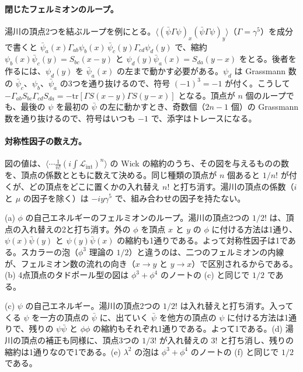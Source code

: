\documentclass[a4paper,10pt]{ltjsarticle}
\begin{document}
\paragraph{閉じたフェルミオンのループ。}湯川の頂点2つを結ぶループを例にとる。$\langle(\bar\psi\Gamma\psi)_x(\bar\psi\Gamma\psi)_y\rangle$（$\Gamma=\gamma^5$）を成分で書くと $\bar\psi_a(x)\Gamma_{ab}\psi_b(x)\,\bar\psi_c(y)\Gamma_{cd}\psi_d(y)$ で、縮約 $\psi_b(x)\bar\psi_c(y)=S_{bc}(x-y)$ と $\psi_d(y)\bar\psi_a(x)=S_{da}(y-x)$ をとる。後者を作るには、$\psi_d(y)$ を $\bar\psi_a(x)$ の左まで動かす必要がある。$\psi_d$ は Grassmann 数の $\bar\psi_c$、$\psi_b$、$\bar\psi_a$ の3つを通り抜けるので、符号 $(-1)^3=-1$ が付く。こうして $-\Gamma_{ab}S_{bc}\Gamma_{cd}S_{da}=-\mathrm{tr}[\Gamma S(x-y)\Gamma S(y-x)]$ となる。頂点が $n$ 個のループでも、最後の $\psi$ を最初の $\bar\psi$ の左に動かすとき、奇数個（$2n-1$ 個）の Grassmann 数を通り抜けるので、符号はいつも $-1$ で、添字はトレースになる。

\paragraph{対称性因子の数え方。}図の値は、$\langle\cdots\frac{1}{n!}(i\int\mathcal{L}_{\mathrm{int}})^n\rangle$ の Wick の縮約のうち、その図を与えるものの数を、頂点の係数とともに数えて決める。同じ種類の頂点が $n$ 個あると $1/n!$ が付くが、どの頂点をどこに置くかの入れ替え $n!$ と打ち消す。湯川の頂点の係数（$i$ と $\mu$ の因子を除く）は $-iy\gamma^5$ で、組み合わせの因子を持たない。

(a) $\phi$ の自己エネルギーのフェルミオンのループ。湯川の頂点2つの $1/2!$ は、頂点の入れ替えの2と打ち消す。外の $\phi$ を頂点 $x$ と $y$ の $\phi$ に付ける方法は1通り、$\psi(x)\bar\psi(y)$ と $\psi(y)\bar\psi(x)$ の縮約も1通りである。よって対称性因子は1である。スカラーの泡（$\phi^3$ 理論の $1/2$）と違うのは、二つのフェルミオンの内線が、フェルミオン数の流れの向き（$x\to y$ と $y\to x$）で区別されるからである。(b) 4点頂点のタドポール型の図は $\phi^3+\phi^4$ のノートの (c) と同じで $1/2$ である。

(c) $\psi$ の自己エネルギー。湯川の頂点2つの $1/2!$ は入れ替えと打ち消す。入ってくる $\psi$ を一方の頂点の $\bar\psi$ に、出ていく $\bar\psi$ を他方の頂点の $\psi$ に付ける方法は1通りで、残りの $\psi\bar\psi$ と $\phi\phi$ の縮約もそれぞれ1通りである。よって1である。(d) 湯川の頂点の補正も同様に、頂点3つの $1/3!$ が入れ替えの $3!$ と打ち消し、残りの縮約は1通りなので1である。(e) $\lambda^2$ の泡は $\phi^3+\phi^4$ のノートの (f) と同じで $1/2$ である。
\end{document}
